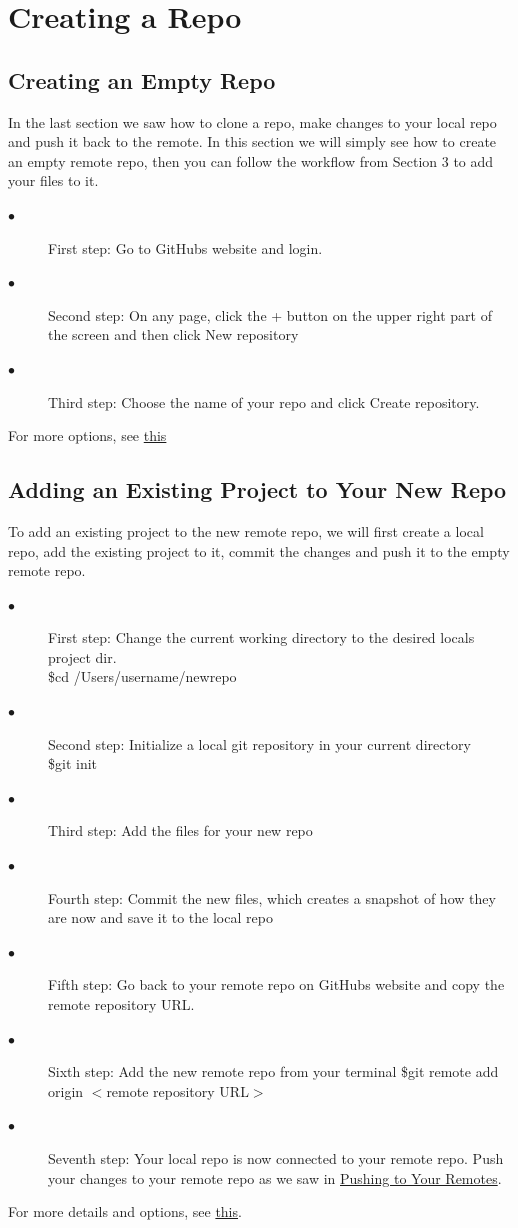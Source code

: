 \documentclass[12pt]{article}
\begin{document}
    \section{Creating a Repo}
    \subsection{Creating an Empty Repo}
    In the last section we saw how to clone a repo, make changes to your local repo and push it back to the remote. In this section we will simply see how to create an empty remote repo, then you can follow the workflow from Section 3 to add your files to it.
    \begin{description}
    \item[$\bullet$] First step: Go to GitHub\textquotesingle s website and login.
    \item[$\bullet$] Second step: On any page, click the + button on the upper right part of the screen and then click New repository 
    \item[$\bullet$] Third step: Choose the name of your repo and click Create repository. 
    \end{description}
    For more options, see \href{https://help.github.com/articles/creating-a-new-repository/}{this}
    \subsection{Adding an Existing Project to Your New Repo}
    To add an existing project to the new remote repo, we will first create a local repo, add the existing project to it, commit the changes and push it to the empty remote repo. 
    \begin{description}
    \item[$\bullet$] First step: Change the current working directory to the desired local\textquotesingle s project dir. \\
    \indent \$cd /Users/username/newrepo \\
    \item[$\bullet$] Second step: Initialize a local git repository in your current directory \\  
    \indent \$git init \\
    \item[$\bullet$] Third step: Add the files for your new repo 
    \item[$\bullet$] Fourth step: Commit the new files, which creates a snapshot of how they are now and save it to the local repo
    \item[$\bullet$] Fifth step: Go back to your remote repo on GitHub\textquotesingle s website and copy the remote repository URL.
    \item[$\bullet$] Sixth step: Add the new remote repo from your terminal
    \indent \$git remote add origin $<$remote repository URL$>$
    \item[$\bullet$] Seventh step: Your local repo is now connected to your remote repo. Push your changes to your remote repo as we saw in \hyperref[sec:pushing]{Pushing to Your Remotes}.
    \end{description}
    For more details and options, see \href{https://help.github.com/articles/adding-an-existing-project-to-github-using-the-command-line/}{this}.
\end{document}
